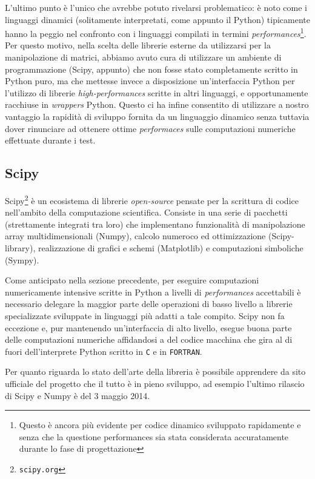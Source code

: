\documentclass[11pt,a4paper]{scrartcl}
\begin{document}
L'ultimo punto è l'unico che avrebbe potuto rivelarsi problematico: è noto come i linguaggi dinamici (solitamente interpretati, come appunto il Python) tipicamente hanno la peggio nel confronto con i linguaggi compilati in termini \emph{performances}\footnote{Questo è ancora più evidente per codice dinamico sviluppato rapidamente e senza che la questione performances sia stata considerata accuratamente durante lo fase di progettazione}. Per questo motivo, nella scelta delle librerie esterne da utilizzarsi per la manipolazione di matrici, abbiamo avuto cura di utilizzare un ambiente di programmazione (Scipy, appunto) che non fosse stato completamente scritto in Python puro, ma che mettesse invece a disposizione un'interfaccia Python per l'utilizzo di librerie \emph{high-performances} scritte in altri linguaggi, e opportunamente racchiuse in \emph{wrappers} Python. Questo ci ha infine consentito di utilizzare a nostro vantaggio la rapidità di sviluppo fornita da un linguaggio dinamico senza tuttavia dover rinunciare ad ottenere ottime \emph{performaces} sulle computazioni numeriche effettuate durante i test.


\subsection*{Scipy}
Scipy\footnote{\texttt{scipy.org}} è un ecosistema di librerie \emph{open-source} pensate per la scrittura di codice nell'ambito della computazione scientifica. Consiste in una serie di pacchetti (strettamente integrati tra loro) che implementano funzionalità di manipolazione array multidimensionali (Numpy), calcolo numeroco ed ottimizzazione (Scipy-library), realizzazione di grafici e schemi (Matplotlib) e computazioni simboliche (Sympy).

Come anticipato nella sezione precedente, per eseguire computazioni numericamente intensive scritte in Python a livelli di \emph{performances} accettabili è necessario delegare la maggior parte delle operazioni di basso livello a librerie specializzate sviluppate in linguaggi più adatti a tale compito. Scipy non fa eccezione e, pur mantenendo un'interfaccia di alto livello, esegue buona parte delle computazioni numeriche affidandosi a del codice macchina che gira al di fuori dell'interprete Python scritto in \texttt{C} e in \texttt{FORTRAN}. 

Per quanto riguarda lo stato dell'arte della libreria è possibile apprendere da sito ufficiale del progetto che il tutto è in pieno sviluppo, ad esempio l'ultimo rilascio di Scipy e Numpy è del 3 maggio 2014.
\end{document}
